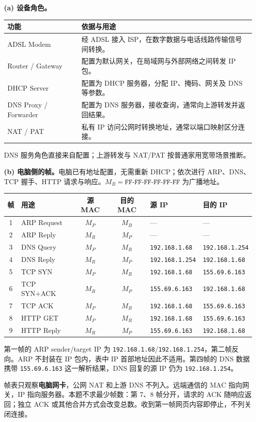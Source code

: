 \begin{checkedsolution}
\textbf{(a) 设备角色。}
\begin{center}
\small
\begin{tabularx}{\textwidth}{@{}>{\raggedright\arraybackslash}p{4.2cm}X@{}}
\toprule
功能 & 依据与用途 \\
\midrule
ADSL Modem & 经 ADSL 接入 ISP，在数字数据与电话线路传输信号间转换。\\
Router / Gateway & 配置为默认网关，在局域网与外部网络之间转发 IP 包。\\
DHCP Server & 配置为 DHCP 服务器，分配 IP、掩码、网关及 DNS 等参数。\\
DNS Proxy / Forwarder & 配置为 DNS 服务器，接收查询，通常向上游转发并返回结果。\\
NAT / PAT & 私有 IP 访问公网时转换地址，通常以端口映射区分连接。\\
\bottomrule
\end{tabularx}
\end{center}
DNS 服务角色直接来自配置；上游转发与 NAT/PAT 按普通家用宽带场景推断。

\textbf{(b) 电脑侧的帧。}电脑已有地址配置，无需重新 DHCP；依次进行 ARP、DNS、TCP 握手、HTTP 请求与响应。$M_B=\texttt{FF-FF-FF-FF-FF-FF}$ 为广播地址。
\begin{center}
\small
\begin{tabular}{@{}clccll@{}}
\toprule
帧 & 用途 & 源 MAC & 目的 MAC & 源 IP & 目的 IP \\
\midrule
1 & ARP Request & $M_P$ & $M_B$ & --- & --- \\
2 & ARP Reply & $M_R$ & $M_P$ & --- & --- \\
3 & DNS Query & $M_P$ & $M_R$ & \texttt{192.168.1.68} & \texttt{192.168.1.254} \\
4 & DNS Reply & $M_R$ & $M_P$ & \texttt{192.168.1.254} & \texttt{192.168.1.68} \\
5 & TCP SYN & $M_P$ & $M_R$ & \texttt{192.168.1.68} & \texttt{155.69.6.163} \\
6 & TCP SYN+ACK & $M_R$ & $M_P$ & \texttt{155.69.6.163} & \texttt{192.168.1.68} \\
7 & TCP ACK & $M_P$ & $M_R$ & \texttt{192.168.1.68} & \texttt{155.69.6.163} \\
8 & HTTP GET & $M_P$ & $M_R$ & \texttt{192.168.1.68} & \texttt{155.69.6.163} \\
9 & HTTP Reply & $M_R$ & $M_P$ & \texttt{155.69.6.163} & \texttt{192.168.1.68} \\
\bottomrule
\end{tabular}
\end{center}
第一帧的 ARP sender/target IP 为 \texttt{192.168.1.68}/\texttt{192.168.1.254}，第二帧反向。ARP 不封装在 IP 包内，表中 IP 首部地址因此不适用。第四帧的 DNS 数据携带 \texttt{155.69.6.163} 这一解析结果，DNS 回复的源 IP 仍为 \texttt{192.168.1.254}。

帧表只观察\textbf{电脑网卡}，公网 NAT 和上游 DNS 不列入。远端通信的 MAC 指向网关，IP 指向服务器。本题不求最少帧数：第 7、8 帧分开，请求的 ACK 随响应返回；独立 ACK 或其他合并方式会改变总数。收到第一帧网页内容即停止，不列关闭连接。
\end{checkedsolution}

